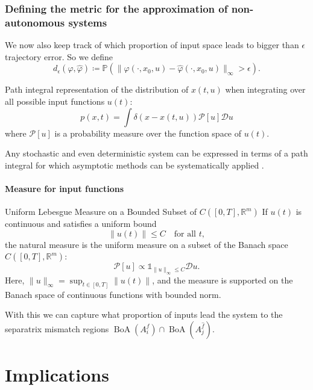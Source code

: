 \documentclass{article}
\theoremstyle{definition} \newtheorem{definition}{Definition}
\theoremstyle{remark} \newtheorem{remark}{Remark}
\newcommand{\reals}{\mathbb{R}}
\newcommand{\boa}{\operatorname{BoA}}
\newcounter{ct}
\begin{document}
\subsubsection{Defining the metric for the approximation of non-autonomous systems}\label{sec:inputdriven_metric}
We now also keep track of which proportion of input space leads to bigger than $\epsilon$ trajectory error.
So we define 
\begin{equation}%
d_\epsilon(\varphi,\hat \varphi) \coloneqq  \mathbb{P}\left(\|\varphi(\cdot,x_0,u)-\hat \varphi(\cdot,x_0,u)\|_\infty>\epsilon\right).
\end{equation}


Path integral representation of the distribution of $x(t,u)$ when integrating over all possible input functions $u(t)$:
\begin{equation}
    p(x,t) = \int \delta(x - x(t, u)) \mathcal{P}[u] \mathcal{D}u
\end{equation}
where $\mathcal{P}[u]$ is a probability measure over the function space of $u(t)$.

Any stochastic and even deterministic system can be expressed in terms of a path integral for which asymptotic methods can be systematically applied \citep{chow2015path}.


\paragraph{Measure for input functions}
Uniform Lebesgue Measure on a Bounded Subset of \( C([0,T], \reals^m) \)
If \( u(t) \) is continuous and satisfies a uniform bound
\[
\|u(t)\| \leq C \quad \text{for all } t,
\]
the natural measure is the uniform measure on a subset of the Banach space \( C([0,T], \reals^m) \):
\[
\mathcal{P}[u] \propto \mathds{1}_{\|u\|_\infty \leq C} \mathcal{D} u.
\]
Here, \( \|u\|_\infty = \sup_{t \in [0,T]} \|u(t)\| \), and the measure is supported on the Banach space of continuous functions with bounded norm.

With this we can capture what proportion of inputs lead the system to the separatrix mismatch regions $\boa(A_i^f)\cap\boa(A_j^{\hat{f}})$. %






\newpage
\section{Implications}
\end{document}
